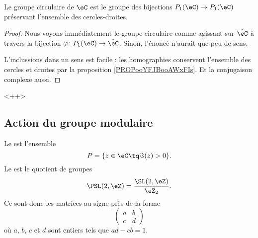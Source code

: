 \begin{theorem}       \label{THOooKMKWooZPIDaK}
    Le groupe circulaire de \( \eC\) est le groupe des bijections \( P_1(\eC)\to P_1(\eC)\) préservant l'ensemble des cercles-droites.
\end{theorem}

\begin{proof}
    Nous voyons immédiatement le groupe circulaire comme agissant sur \( \hat\eC\) à travers la bijection \( \varphi\colon P_1(\eC)\to \hat \eC\). Sinon, l'énoncé n'aurait que peu de sens.

    L'inclussions dans un sens est facile : les homographies conservent l'ensemble des cercles et droites par la proposition \ref{PROPooYFJBooAWxFIs}. Et la conjugaison complexe aussi.
\end{proof}
<++>


\subsection{Action du groupe modulaire}

Le  est l'ensemble
\begin{equation}
    P=\{ z\in \eC\tq \Im(z)>0 \}.
\end{equation}
Le  est le quotient de groupes
\begin{equation}
    \PSL(2,\eZ)=\frac{ \SL(2,\eZ) }{ \eZ_2 }.
\end{equation}
Ce sont donc les matrices au signe près de la forme
\begin{equation}
    \begin{pmatrix}
        a    &   b    \\ 
        c    &   d    
    \end{pmatrix}
\end{equation}
où \( a\), \( b\), \( c\) et \( d\) sont entiers tels que \( ad-cb=1\).

